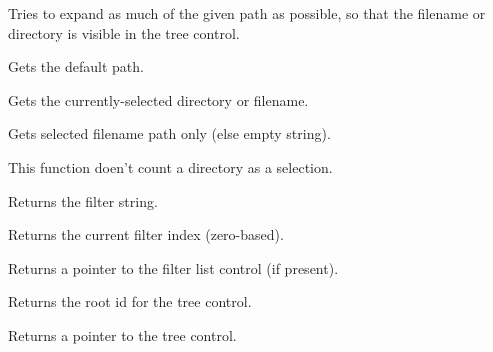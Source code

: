 Tries to expand as much of the given path as possible, so that the filename or directory is visible in the tree control.

\label{wxgenericdirctrlgetdefaultpath}


Gets the default path.

\label{wxgenericdirctrlgetpath}


Gets the currently-selected directory or filename.

\label{wxgenericdirctrlgetfilepath}


Gets selected filename path only (else empty string).

This function doen't count a directory as a selection.

\label{wxgenericdirctrlgetfilter}


Returns the filter string.

\label{wxgenericdirctrlgetfilterindex}


Returns the current filter index (zero-based).

\label{wxgenericdirctrlgetfilterlistctrl}


Returns a pointer to the filter list control (if present).

\label{wxgenericdirctrlgetrootid}


Returns the root id for the tree control.

\label{wxgenericdirctrlgettreectrl}


Returns a pointer to the tree control.

\label{wxgenericdirctrlsetdefaultpath}

